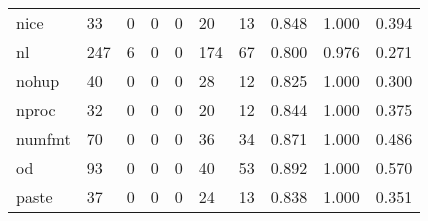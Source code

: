 \begin{longtable}{lp{2.0cm}p{2.0cm}p{2.0cm}p{2.0cm}p{2.0cm}p{2.0cm}p{2.0cm}p{2.0cm}p{2.0cm}}
nice      &                     33 &                                             0 &                                            0 &                                           0 &                                           20 &                                         13 &                                0.848 &                                  1.000 &                                0.394 \\
nl        &                    247 &                                             6 &                                            0 &                                           0 &                                          174 &                                         67 &                                0.800 &                                  0.976 &                                0.271 \\
nohup     &                     40 &                                             0 &                                            0 &                                           0 &                                           28 &                                         12 &                                0.825 &                                  1.000 &                                0.300 \\
nproc     &                     32 &                                             0 &                                            0 &                                           0 &                                           20 &                                         12 &                                0.844 &                                  1.000 &                                0.375 \\
numfmt    &                     70 &                                             0 &                                            0 &                                           0 &                                           36 &                                         34 &                                0.871 &                                  1.000 &                                0.486 \\
od        &                     93 &                                             0 &                                            0 &                                           0 &                                           40 &                                         53 &                                0.892 &                                  1.000 &                                0.570 \\
paste     &                     37 &                                             0 &                                            0 &                                           0 &                                           24 &                                         13 &                                0.838 &                                  1.000 &                                0.351 \\

\end{longtable}
